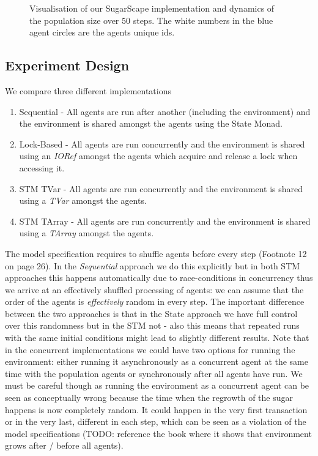 \begin{figure}
\begin{center}
	\caption{Visualisation of our SugarScape implementation and dynamics of the population size over 50 steps. The white numbers in the blue agent circles are the agents unique ids.}
	\label{fig:vis_sugarscape}
\end{center}
\end{figure}

\subsection{Experiment Design}
We compare three different implementations

\begin{enumerate}
	\item Sequential - All agents are run after another (including the environment) and the environment is shared amongst the agents using the State Monad.
	\item Lock-Based - All agents are run concurrently and the environment is shared using an \textit{IORef} amongst the agents which acquire and release a lock when accessing it.
	\item STM TVar - All agents are run concurrently and the environment is shared using a \textit{TVar} amongst the agents.
	\item STM TArray - All agents are run concurrently and the environment is shared using a \textit{TArray} amongst the agents. 
\end{enumerate}

The model specification requires to shuffle agents before every step (Footnote 12 on page 26). In the \textit{Sequential} approach we do this explicitly but in both STM approaches this happens automatically due to race-conditions in concurrency thus we arrive at an effectively shuffled processing of agents: we can assume that the order of the agents is \textit{effectively} random in every step. The important difference between the two approaches is that in the State approach we have full control over this randomness but in the STM not - also this means that repeated runs with the same initial conditions might lead to slightly different results.
Note that in the concurrent implementations we could have two options for running the environment: either running it asynchronously as a concurrent agent at the same time with the population agents or synchronously after all agents have run. We must be careful though as running the environment as a concurrent agent can be seen as conceptually wrong because the time when the regrowth of the sugar happens is now completely random. It could happen in the very first transaction or in the very last, different in each step, which can be seen as a violation of the model specifications (TODO: reference the book where it shows that environment grows after / before all agents).

